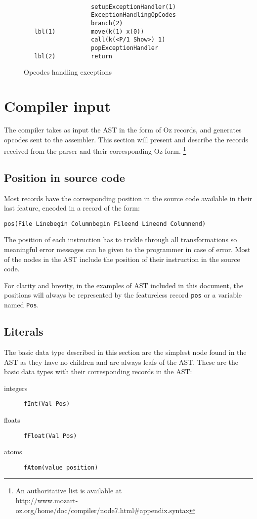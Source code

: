 \documentclass[a4paper]{memoir}
\begin{document}
\begin{figure}[ht]
\begin{lstlisting}
    
                   setupExceptionHandler(1)
                   ExceptionHandlingOpCodes
                   branch(2)
   lbl(1)          move(k(1) x(0))
                   call(k(<P/1 Show>) 1)
                   popExceptionHandler
   lbl(2)          return
\end{lstlisting}
\caption{Opcodes handling exceptions}
\label{fig:opcodes:exception:result}
\end{figure}


\section{Compiler input}\label{section:compilerinput}
The compiler takes as input the AST in the form of Oz records, and generates opcodes sent to the assembler. 
This section will present and describe the records received from the parser and
their corresponding Oz form.
\footnote{An authoritative list is available at \\http://www.mozart-oz.org/home/doc/compiler/node7.html\#appendix.syntax} 
\subsection{Position in source code}
Most records have the corresponding position in the source code available in
their last feature, encoded in a record of the form:
\begin{lstlisting}
pos(File Linebegin Columnbegin Fileend Lineend Columnend)
\end{lstlisting}
The position of each instruction has to trickle through all transformations so meaningful error messages can be given to the programmer in case of error.
Most of the nodes in the AST include the position of their instruction in the
source code.

For clarity and brevity, in the examples of AST included in this document, the
positions will always be represented by the featureless record \lstinline!pos!
or a variable named \lstinline!Pos!. 
\subsection{Literals}
The basic data type described in this section are the simplest node found in the AST as they have no children and are always leafs of the AST.
These are the basic data types with their corresponding records in the AST:
\begin{description}
  \item[integers] \lstinline!fInt(Val Pos)!
  \item[floats] \lstinline!fFloat(Val Pos)!
  \item[atoms] \lstinline!fAtom(value position)!
\end{description}
\end{document}
